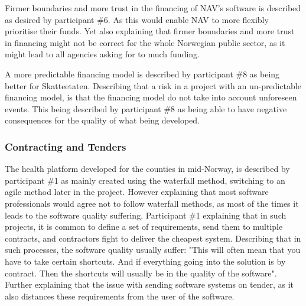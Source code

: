 Firmer boundaries and more trust in the financing of NAV's software is described as desired by participant \#6. As this would enable NAV to more flexibly prioritise their funds. Yet also explaining that firmer boundaries and more trust in financing might not be correct for the whole Norwegian public sector, as it might lead to all agencies asking for to much funding. 


A more predictable financing model is described by participant \#8 as being better for Skatteetaten. Describing that a risk in a project with an un-predictable financing model, is that the financing model do not take into account unforeseen events. This being described by participant \#8 as being able to have negative consequences for the quality of what being developed.


\subsubsection{Contracting and Tenders}
The health platform developed for the counties in mid-Norway, is described by participant \#1 as mainly created using the waterfall method, switching to an agile method later in the project. However explaining that most software professionals would agree not to follow waterfall methods, as most of the times it leads to the software quality suffering. Participant \#1 explaining that in such projects, it is common to define a set of requirements, send them to multiple contracts, and contractors fight to deliver the cheapest system. Describing that in such processes, the software quality usually suffer: "This will often mean that you have to take certain shortcuts. And if everything going into the solution is by contract. Then the shortcuts will usually be in the quality of the software". Further explaining that the issue with sending software systems on tender, as it also distances these requirements from the user of the software.

